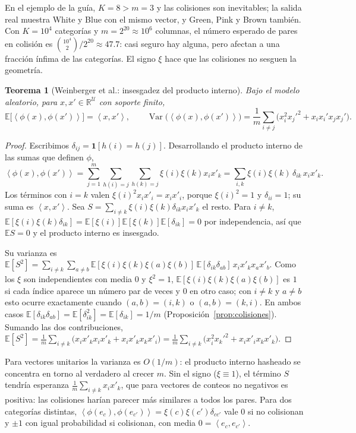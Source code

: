 \documentclass[11pt]{article}
\newtheorem{teorema}{Teorema}[section]
\theoremstyle{definition}
\theoremstyle{remark}
\newcommand{\R}{\mathbb{R}}
\newcommand{\E}{\mathbb{E}}
\DeclareMathOperator{\Var}{Var}
\newcommand{\ind}[1]{\mathbf{1}\!\left[#1\right]}
\newcommand{\ip}[2]{\left\langle #1,#2\right\rangle}
\begin{document}
\noindent En el ejemplo de la guía, $K=8>m=3$ y las colisiones son inevitables; la salida real muestra White y Blue con el mismo vector, y Green, Pink y Brown también. Con $K=10^4$ categorías y $m=2^{20}\approx10^6$ columnas, el número esperado de pares en colisión es $\binom{10^4}2/2^{20}\approx47.7$: casi seguro hay alguna, pero afectan a una fracción ínfima de las categorías. El signo $\xi$ hace que las colisiones no sesguen la geometría.

\begin{teorema}[Weinberger et al.: insesgadez del producto interno]\label{teo:hash}
\noindent Bajo el modelo aleatorio, para $x,x'\in\R^{\mathcal U}$ con soporte finito,
\[
\E\big[\ip{\phi(x)}{\phi(x')}\big]=\ip{x}{x'},\qquad \Var\big(\ip{\phi(x)}{\phi(x')}\big)=\frac1m\sum_{i\ne j}\big(x_i^2x_j'^2+x_ix_i'x_jx_j'\big).
\]
\end{teorema}
\begin{proof}
\noindent Escribimos $\delta_{ij}=\ind{h(i)=h(j)}$. Desarrollando el producto interno de las sumas que definen $\phi$,
\[
\ip{\phi(x)}{\phi(x')}=\sum_{j=1}^m\sum_{h(i)=j}\sum_{h(k)=j}\xi(i)\xi(k)x_ix'_k=\sum_{i,k}\xi(i)\xi(k)\,\delta_{ik}\,x_ix'_k.
\]
Los términos con $i=k$ valen $\xi(i)^2x_ix'_i=x_ix'_i$, porque $\xi(i)^2=1$ y $\delta_{ii}=1$; su suma es $\ip x{x'}$. Sea $S=\sum_{i\ne k}\xi(i)\xi(k)\delta_{ik}x_ix'_k$ el resto. Para $i\ne k$, $\E[\xi(i)\xi(k)\delta_{ik}]=\E[\xi(i)]\E[\xi(k)]\E[\delta_{ik}]=0$ por independencia, así que $\E S=0$ y el producto interno es insesgado.

\medskip

\noindent Su varianza es $\E[S^2]=\sum_{i\ne k}\sum_{a\ne b}\E[\xi(i)\xi(k)\xi(a)\xi(b)]\,\E[\delta_{ik}\delta_{ab}]\,x_ix'_kx_ax'_b$. Como los $\xi$ son independientes con media $0$ y $\xi^2=1$, $\E[\xi(i)\xi(k)\xi(a)\xi(b)]$ es $1$ si cada índice aparece un número par de veces y $0$ en otro caso; con $i\ne k$ y $a\ne b$ esto ocurre exactamente cuando $(a,b)=(i,k)$ o $(a,b)=(k,i)$. En ambos casos $\E[\delta_{ik}\delta_{ab}]=\E[\delta_{ik}^2]=\E[\delta_{ik}]=1/m$ (Proposición~\ref{prop:colisiones}). Sumando las dos contribuciones, $\E[S^2]=\frac1m\sum_{i\ne k}\big(x_ix'_kx_ix'_k+x_ix'_kx_kx'_i\big)=\frac1m\sum_{i\ne k}\big(x_i^2x_k'^2+x_ix'_ix_kx'_k\big)$.
\end{proof}

\noindent Para vectores unitarios la varianza es $O(1/m)$: el producto interno hasheado se concentra en torno al verdadero al crecer $m$. Sin el signo ($\xi\equiv1$), el término $S$ tendría esperanza $\frac1m\sum_{i\ne k}x_ix'_k$, que para vectores de conteos no negativos es positiva: las colisiones harían parecer más similares a todos los pares. Para dos categorías distintas, $\ip{\phi(e_c)}{\phi(e_{c'})}=\xi(c)\xi(c')\delta_{cc'}$ vale $0$ si no colisionan y $\pm1$ con igual probabilidad si colisionan, con media $0=\ip{e_c}{e_{c'}}$.
\end{document}
